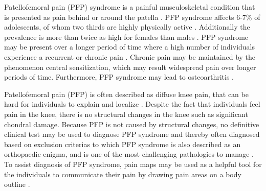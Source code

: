 Patellofemoral pain (PFP) syndrome is a painful musculoskeletal condition that is presented as pain behind or around the patella \citep{Maclachlan2017, Smith2015}. PFP syndrome affects 6-7\% of adolescents, of whom two thirds are highly physically active \citep{Rathleff2015}. Additionally the prevalence is more than twice as high for females than males \citep{Rathleff2015, Petersen2013}.
PFP syndrome may be present over a longer period of time where a high number of individuals experience a recurrent or chronic pain \citep{Witvrouw2014}. Chronic pain may be maintained by the phenomenon central sensitization, which may result widespread pain over longer periods of time. Furthermore, PFP syndrome may lead to osteoarthritis \citep{Petersen2013, Crossley2016}. 

\noindent
Patellofemoral pain (PFP) is often described as diffuse knee pain, that can be hard for individuals to explain and localize \citep{Witvrouw2014}. Despite the fact that individuals feel pain in the knee, there is no structural changes in the knee such as significant chondral damage. Because PFP is not caused by structural changes, no definitive clinical test may be used to diagnose PFP syndrome and thereby often diagnosed based on exclusion criterias \citep{Petersen2013} to which PFP syndrome is also described as an orthopaedic enigma, and is one of the most challenging pathologies to manage \citep{Dye2001}.
To assist diagnosis of PFP syndrome, pain maps may be used as a helpful tool for the individuals to communicate their pain by drawing pain areas on a body outline \citep{Boudreau2016}.

